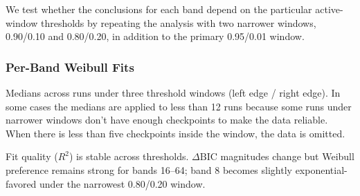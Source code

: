 \documentclass{article}
\begin{document}
We test whether the conclusions for each band depend on the particular
active-window thresholds by repeating the analysis with two narrower
windows, 0.90/0.10 and 0.80/0.20, in addition to the primary 0.95/0.01
window. 

\subsubsection{Per-Band Weibull Fits}\label{app:robustness-per-band-fits}

Medians across runs under three threshold windows (left edge / right
edge). In some cases the medians are applied to less than 12 runs because
some runs under narrower windows don't have enough checkpoints to make
the data reliable. When there is less than five checkpoints inside the 
window, the data is omitted.

\begin{center}
\footnotesize
{}
\end{center}

Fit quality ($R^2$) is stable across thresholds. $\Delta\mathrm{BIC}$ magnitudes change but
Weibull preference remains strong for bands 16--64; band 8 becomes
slightly exponential-favored under the narrowest 0.80/0.20 window.
\end{document}
